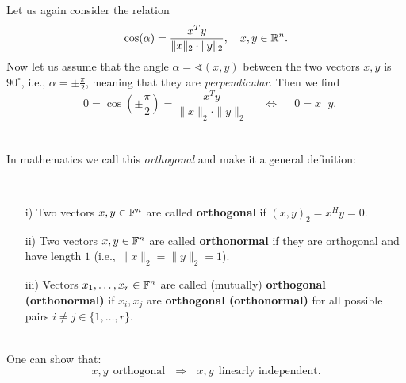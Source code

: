 \begin{frame}
Let us again consider the relation 
$$\cos(\alpha) = \frac{x^Ty}{\|x\|_2\cdot\|y\|_2},~~~x,y\in{\mathbb{R}}^{n}  .$$
Now let us assume that the angle $\alpha = \sphericalangle(x,y)$ between the two vectors $x,y$ is $90^\circ$, i.e., $\alpha =\pm \frac{\pi}{2}$, meaning that they are \textit{perpendicular}. Then we find
\begin{equation*}
 ~~~0 = \cos\left(\pm \frac{\pi}{2}\right) = \frac{x^Ty}{\|x\|_2\cdot\|y\|_2}  
 ~~~~~~\Leftrightarrow~~~~~~ 0 = x^\top y.
\end{equation*}
~\\~\\
In mathematics we call this \textit{orthogonal} and make it a general definition:\vspace{-0.25cm}
\begin{defi}~\\
\begin{itemize}
	\item[i)] Two vectors $x,y \in {\mathbb{F}}^n$ are called \textbf{orthogonal} if $(x,y)_2 = x^H y  = 0$.
	\item[ii)] Two vectors $x,y \in {\mathbb{F}}^n$ are called \textbf{orthonormal} if they are orthogonal and have length $1$ (i.e., $\|x\|_2=\|y\|_2=1$).
	\item[iii)] Vectors $x_1, \ldots, x_r \in {\mathbb{F}}^n$ are called (mutually) \textbf{orthogonal (orthonormal)} if $x_i, x_j$ are \textbf{orthogonal (orthonormal)} for all possible pairs $i\neq j \in \{ 1,\ldots, r\}$.
\end{itemize} 
\end{defi} 
~\\
{\color{satzrot} One can show that:
\begin{equation}\label{eq:orthoImpliesIndepen}
x,y ~~\text{orthogonal} ~~~\Rightarrow ~~~ x,y~~\text{linearly independent} .
\end{equation}
}
\end{frame}

